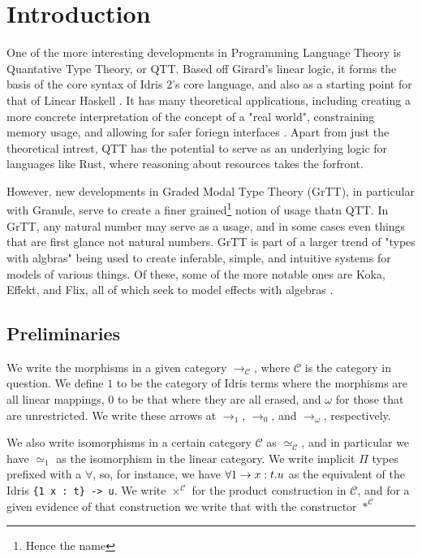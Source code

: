\section{Introduction}

One of the more interesting developments in Programming Language Theory is Quantative Type Theory, or QTT.
Based off Girard's linear logic, it forms the basis of the core syntax of Idris 2's core language, and also as a starting point for that of Linear Haskell \cite{idris,linear_haskell,linear_logic,syntax_semantics_linear_types}.
It has many theoretical applications, including creating a more concrete interpretation of the concept of a "real world", constraining memory usage, and allowing for safer foriegn interfaces \needcite. 
Apart from just the theoretical intrest, QTT has the potential to serve as an underlying logic for languages like Rust, where reasoning about resources takes the forfront.

However, new developments in Graded Modal Type Theory (GrTT), in particular with Granule, serve to create a finer grained\footnote{Hence the name} notion of usage thatn QTT.
In GrTT, any natural number may serve as a usage, and in some cases even things that are first glance not natural numbers.
GrTT is part of a larger trend of "types with algbras" being used to create inferable, simple, and intuitive systems for models of various things.
Of these, some of the more notable ones are Koka, Effekt, and Flix, all of which seek to model effects with algebras \cite{flix_paper,effekt,koka_1}.

\subsection*{Preliminaries}

We write the morphisms in a given category $\to_{\mathcal{C}}$, where $\mathcal{C}$ is the category in question.
We define $1$ to be the category of Idris terms where the morphisms are all linear mappings, $0$ to be that where they are all erased, and $\omega$ for those that are unrestricted.
We write these arrows at $\to_1$, $\to_0$, and $\to_\omega$, respectively.

We also write isomorphisms in a certain category $\mathcal{C}$ as $\simeq_{\mathcal{C}}$, and in particular we have $\simeq_1$ as the isomorphism in the linear category.
We write implicit $\Pi$ types prefixed with a $\forall$, so, for instance, we have $\fa1 x : t . u$ as the equivalent of the Idris \verb|{1 x : t} -> u|.
We write $\times^{\mathcal{C}}$ for the product construction in $\mathcal{C}$, and for a given evidence of that construction we write that with the constructor $*^{\mathcal{C}}$
